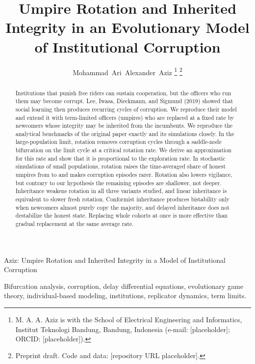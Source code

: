 \documentclass[journal]{IEEEtran}
\begin{document}
\title{Umpire Rotation and Inherited Integrity in an Evolutionary Model of Institutional
Corruption}

\author{Mohammad~Ari~Alexander~Aziz%
\thanks{M. A. A. Aziz is with the School of Electrical Engineering and Informatics, Institut
Teknologi Bandung, Bandung, Indonesia (e-mail: [placeholder]; ORCID: [placeholder]).}%
\thanks{Preprint draft. Code and data: [repository URL placeholder].}}

%
{Aziz: Umpire Rotation and Inherited Integrity in a Model of Institutional Corruption}

\maketitle

\begin{abstract}
Institutions that punish free riders can sustain cooperation, but the officers who run them may
become corrupt. Lee, Iwasa, Dieckmann, and Sigmund (2019) showed that social learning then
produces recurring cycles of corruption. We reproduce their model and extend it with
term-limited officers (umpires) who are replaced at a fixed rate by newcomers whose integrity may
be inherited from the incumbents. We reproduce the analytical benchmarks of the original paper
exactly and its simulations closely.
In the large-population limit, rotation removes corruption cycles through a saddle-node
bifurcation on the limit cycle at a critical rotation rate. We derive an approximation for this
rate and show that it is proportional to the exploration rate. In stochastic simulations of small
populations, rotation raises the time-averaged share of honest umpires from \HoneYSZero{} to
\HoneYSMax{} and makes corruption episodes rarer. Rotation also lowers vigilance, but contrary to
our hypothesis the remaining episodes are shallower, not deeper. Inheritance weakens rotation in
all three variants studied, and linear inheritance is equivalent to slower fresh rotation.
Conformist inheritance produces bistability only when newcomers almost purely copy the majority,
and delayed inheritance does not destabilize the honest state. Replacing whole cohorts at once is
more effective than gradual replacement at the same average rate.
\end{abstract}

\begin{IEEEkeywords}
Bifurcation analysis, corruption, delay differential equations, evolutionary game theory,
individual-based modeling, institutions, replicator dynamics, term limits.
\end{IEEEkeywords}
\end{document}
